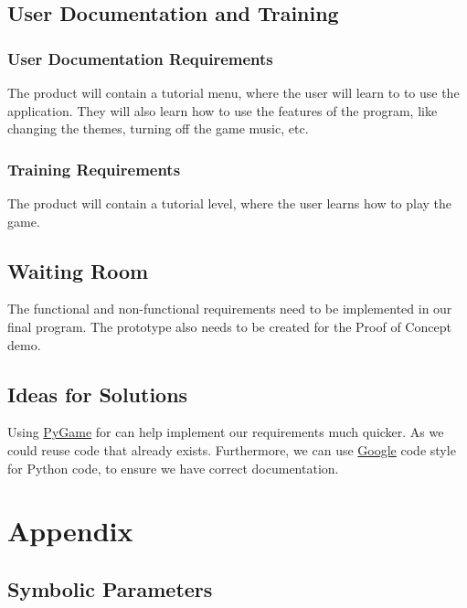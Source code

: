 \documentclass[12pt, titlepage]{article}
\begin{document}
\subsection{User Documentation and Training}
\subsubsection{User Documentation Requirements}

The product will contain a tutorial menu, where the user will learn to to use the application. They will also learn how to use the features of the program, like changing the themes, turning off the game music, etc.

\subsubsection{Training Requirements}

The product will contain a tutorial level, where the user learns how to play the game.

\subsection{Waiting Room}

The functional and non-functional requirements need to be implemented in our final program. The prototype also needs to be created for the Proof of Concept demo.

\subsection{Ideas for Solutions}

Using \href{https://www.pygame.org/news}{PyGame} for can help implement our requirements much quicker. As we could reuse code that already exists. Furthermore, we can use \href{https://github.com/google/styleguide/blob/gh-pages/pyguide.md}{Google} code style for Python code, to ensure we have correct documentation.

\clearpage





\newpage

\section{Appendix}

\subsection{Symbolic Parameters}
\end{document}
